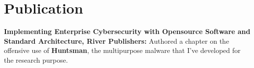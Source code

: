 \documentclass[letterpaper,11pt]{article}
\newcommand{\resumeSubHeadingListStart}{\begin{itemize}[leftmargin=0.15in, label={}]}
\newcommand{\resumeSubHeadingListEnd}{\end{itemize}}
\begin{document}
  \section{Publication}
  \vspace{2pt}
  \resumeSubHeadingListStart
	\small{\item{
			\textbf{Implementing Enterprise Cybersecurity with Opensource Software and Standard Architecture, River Publishers: }{Authored a chapter on the offensive use of \textbf{Huntsman}, the multipurpose malware that I've developed for the research purpose.}
		}}
  \resumeSubHeadingListEnd
\end{document}
